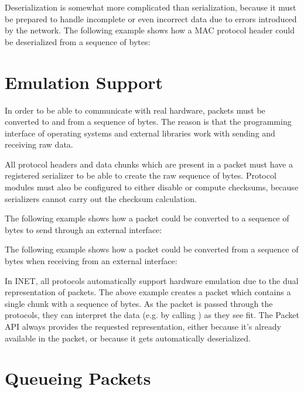 
Deserialization is somewhat more complicated than serialization, because it must
be prepared to handle incomplete or even incorrect data due to errors introduced
by the network. The following example shows how a MAC protocol header could be
deserialized from a sequence of bytes:


\section{Emulation Support}

In order to be able to communicate with real hardware, packets must be converted
to and from a sequence of bytes. The reason is that the programming interface of
operating systems and external libraries work with sending and receiving raw
data.

All protocol headers and data chunks which are present in a packet must have a
registered serializer to be able to create the raw sequence of bytes. Protocol
modules must also be configured to either disable or compute checksums, because
serializers cannot carry out the checksum calculation.

The following example shows how a packet could be converted to a sequence of
bytes to send through an external interface:


The following example shows how a packet could be converted from a sequence of
bytes when receiving from an external interface:


In INET, all protocols automatically support hardware emulation due to the dual
representation of packets. The above example creates a packet which contains a
single chunk with a sequence of bytes. As the packet is passed through the
protocols, they can interpret the data (e.g. by calling ) as
they see fit. The Packet API always provides the requested representation,
either because it's already available in the packet, or because it gets
automatically deserialized.

\section{Queueing Packets}

